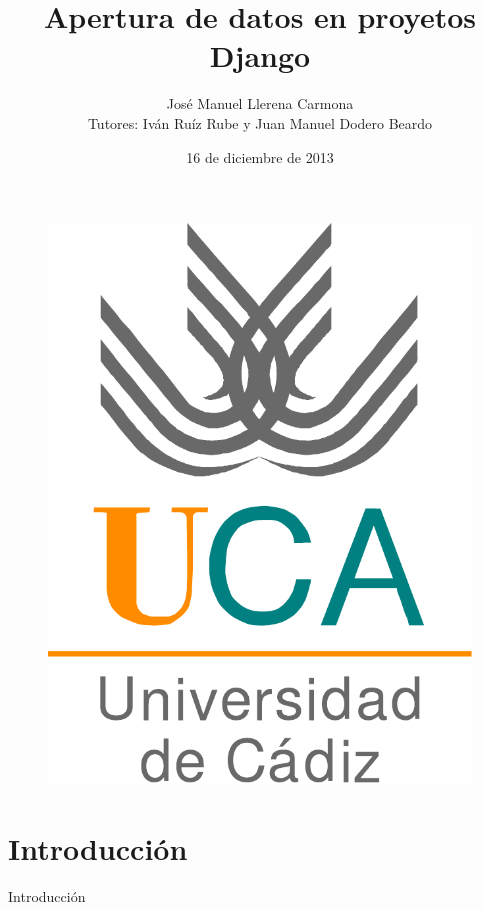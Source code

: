 \documentclass[spanish,xcolor=table,svgnames]{beamer}
\title[Apertura de datos en proyetos Django]{Apertura de datos en proyetos Django}
\author[José Manuel Llerena Carmona]{José Manuel Llerena Carmona\\Tutores: Iván Ruíz Rube y Juan Manuel Dodero Beardo}
\institute[UCA]{Ingeniería Informática  \\ Universidad de Cádiz}
\date{16 de diciembre de 2013}
\begin{document}
\begin{frame}
  \titlepage
  \begin{figure}
	\includegraphics[height=0.2\textheight]{logo_uca} 
  \end{figure}
\end{frame}


\section{Introducción}
\begin{frame}{Introducción}
    \tableofcontents[currentsection]
\end{frame}
\end{document}
